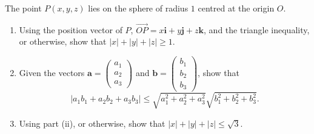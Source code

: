 \begin{problem}
The point $P(x, y, z)$ lies on the sphere of radius $1$ centred at the origin $O$.
\begin{enumerate}[label=(\roman*)]
    \item Using the position vector of $P$, $\vec{OP} = x\mathbf{i} + y\mathbf{j} + z\mathbf{k}$, and the triangle inequality, or otherwise, show that $|x| + |y| + |z| \ge 1$.
    
    \item Given the vectors $\mathbf{a} = \begin{pmatrix} a_1 \\ a_2 \\ a_3 \end{pmatrix}$ and $\mathbf{b} = \begin{pmatrix} b_1 \\ b_2 \\ b_3 \end{pmatrix}$, show that
    \[
    |a_1b_1 + a_2b_2 + a_3b_3| \le \sqrt{a_1^2 + a_2^2 + a_3^2} \sqrt{b_1^2 + b_2^2 + b_3^2}.
    \]
    
    \item Using part (ii), or otherwise, show that $|x| + |y| + |z| \le \sqrt{3}$.
\end{enumerate}
\end{problem}

